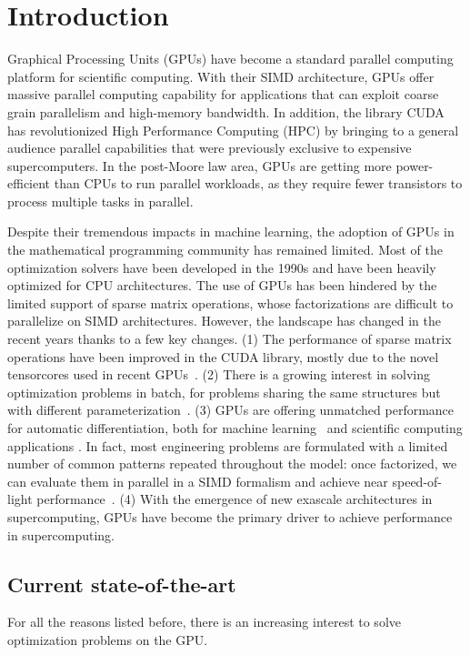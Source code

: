 \section{Introduction}
Graphical Processing Units (GPUs) have become a standard parallel computing platform
for scientific computing. With their SIMD architecture,
GPUs offer massive parallel computing capability for applications
that can exploit coarse grain parallelism and high-memory bandwidth.
In addition, the library CUDA has revolutionized High Performance Computing (HPC)
by bringing to a general audience parallel capabilities that were previously
exclusive to expensive supercomputers. In the post-Moore law area, GPUs
are getting more power-efficient than CPUs to run parallel workloads, as they require
fewer transistors to process multiple tasks in parallel.

Despite their tremendous impacts in machine learning, the
adoption of GPUs in the mathematical programming community has
remained limited. Most of the optimization solvers have been developed
in the 1990s and have been heavily optimized for CPU architectures.
The use of GPUs has been hindered by the limited support of
sparse matrix operations, whose factorizations are difficult to parallelize
on SIMD architectures. However, the landscape has changed in the
recent years thanks to a few key changes.
(1) The performance of sparse matrix operations have been improved
in the CUDA library, mostly due to the novel tensorcores used
in recent GPUs~\cite{markidis2018nvidia}.
(2) There is a growing interest in solving optimization
problems in batch, for problems sharing the same
structures but with different parameterization~\cite{amos2017optnet,pineda2022theseus}.
(3) GPUs are offering unmatched performance for automatic differentiation,
both for machine learning~\cite{jax2018github} and scientific computing applications \cite{enzyme2021}.
In fact, most engineering problems are formulated with a limited
number of common patterns repeated throughout the model: once
factorized, we can evaluate them in parallel in a SIMD formalism
and achieve near speed-of-light performance~\cite{shin2023accelerating}.
(4) With the emergence of new exascale architectures in supercomputing,
GPUs have become the primary driver to achieve performance in
supercomputing.

\subsection{Current state-of-the-art}
For all the reasons listed before, there is an increasing interest
to solve optimization problems on the GPU.

